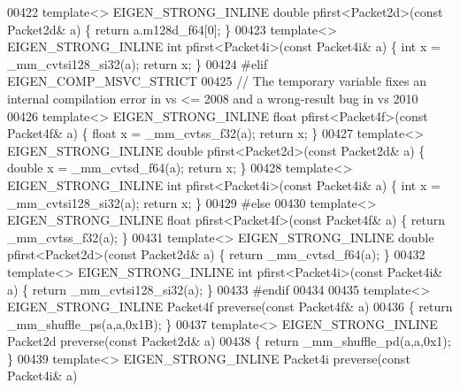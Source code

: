 \begin{DoxyCode}
00422 \textcolor{keyword}{template}<> EIGEN\_STRONG\_INLINE \textcolor{keywordtype}{double} pfirst<Packet2d>(\textcolor{keyword}{const} Packet2d& a) \{ \textcolor{keywordflow}{return} a.m128d\_f64[0]; \}
00423 \textcolor{keyword}{template}<> EIGEN\_STRONG\_INLINE \textcolor{keywordtype}{int}    pfirst<Packet4i>(\textcolor{keyword}{const} Packet4i& a) \{ \textcolor{keywordtype}{int} x = \_mm\_cvtsi128\_si32(a); \textcolor{keywordflow}{
      return} x; \}
00424 \textcolor{preprocessor}{#elif EIGEN\_COMP\_MSVC\_STRICT}
00425 \textcolor{comment}{// The temporary variable fixes an internal compilation error in vs <= 2008 and a wrong-result bug in vs
       2010}
00426 \textcolor{keyword}{template}<> EIGEN\_STRONG\_INLINE \textcolor{keywordtype}{float}  pfirst<Packet4f>(\textcolor{keyword}{const} Packet4f& a) \{ \textcolor{keywordtype}{float} x = \_mm\_cvtss\_f32(a); \textcolor{keywordflow}{
      return} x; \}
00427 \textcolor{keyword}{template}<> EIGEN\_STRONG\_INLINE \textcolor{keywordtype}{double} pfirst<Packet2d>(\textcolor{keyword}{const} Packet2d& a) \{ \textcolor{keywordtype}{double} x = \_mm\_cvtsd\_f64(a); \textcolor{keywordflow}{
      return} x; \}
00428 \textcolor{keyword}{template}<> EIGEN\_STRONG\_INLINE \textcolor{keywordtype}{int}    pfirst<Packet4i>(\textcolor{keyword}{const} Packet4i& a) \{ \textcolor{keywordtype}{int} x = \_mm\_cvtsi128\_si32(a); \textcolor{keywordflow}{
      return} x; \}
00429 \textcolor{preprocessor}{#else}
00430 \textcolor{keyword}{template}<> EIGEN\_STRONG\_INLINE \textcolor{keywordtype}{float}  pfirst<Packet4f>(\textcolor{keyword}{const} Packet4f& a) \{ \textcolor{keywordflow}{return} \_mm\_cvtss\_f32(a); \}
00431 \textcolor{keyword}{template}<> EIGEN\_STRONG\_INLINE \textcolor{keywordtype}{double} pfirst<Packet2d>(\textcolor{keyword}{const} Packet2d& a) \{ \textcolor{keywordflow}{return} \_mm\_cvtsd\_f64(a); \}
00432 \textcolor{keyword}{template}<> EIGEN\_STRONG\_INLINE \textcolor{keywordtype}{int}    pfirst<Packet4i>(\textcolor{keyword}{const} Packet4i& a) \{ \textcolor{keywordflow}{return} \_mm\_cvtsi128\_si32(a); \}
00433 \textcolor{preprocessor}{#endif}
00434 
00435 \textcolor{keyword}{template}<> EIGEN\_STRONG\_INLINE Packet4f preverse(\textcolor{keyword}{const} Packet4f& a)
00436 \{ \textcolor{keywordflow}{return} \_mm\_shuffle\_ps(a,a,0x1B); \}
00437 \textcolor{keyword}{template}<> EIGEN\_STRONG\_INLINE Packet2d preverse(\textcolor{keyword}{const} Packet2d& a)
00438 \{ \textcolor{keywordflow}{return} \_mm\_shuffle\_pd(a,a,0x1); \}
00439 \textcolor{keyword}{template}<> EIGEN\_STRONG\_INLINE Packet4i preverse(\textcolor{keyword}{const} Packet4i& a)

\end{DoxyCode}
